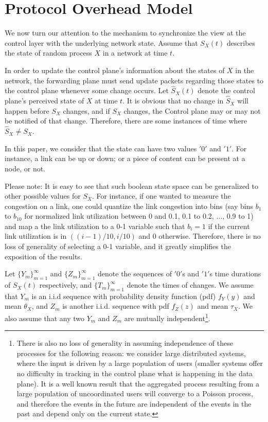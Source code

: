 \documentclass[conference]{IEEEtran}
\theoremstyle{plain}
\theoremstyle{remark}
\begin{document}
\section{Protocol Overhead Model}
\label{sec:protocol}

We now turn our attention to the mechanism to synchronize the view at the control layer with the underlying network state. Assume that $S_X(t)$ describes the state of random process $X$ in a network at time $t$. 

In order to update the control plane's information about the states of $X$ in the network, the forwarding plane must send update packets regarding those states to the control plane whenever some change occurs. Let $\hat{S}_X(t)$ denote the control plane's perceived state of $X$ at time $t$. It is obvious that no change in $\hat{S}_X$ will happen before $S_X$ changes, and if $S_X$ changes, the Control plane may or may not be notified of that change. Therefore,  there are some instances of time where $\hat{S}_X\ne S_X$. 

In this paper, we consider that the state can have two values $'0'$ and $'1'$. For instance, a link can be up or down; or a piece of content can be present at a node, or not. 

Please note: It is easy to see that such boolean state space can be generalized to other possible values for $S_X$. For instance, if one wanted to measure the congestion on a link, one could quantize the link congestion into bins (say bins $b_1$ to $b_{10}$ for normalized link utilization between 0 and 0.1, 0.1 to 0.2, $\ldots$, 0.9 to 1) and map a the link utilization to a 0-1 variable such that $b_i = 1$ if the current link utilization is in $((i-1)/10,i/10)$ and 0 otherwise. Therefore, there is no loss of generality of selecting a 0-1 variable, and it greatly simplifies the exposition of the results. 

Let $\{Y_m\}_{m=1}^{\infty}$ and $\{Z_m\}_{m=1}^{\infty}$ denote the sequences of $'0'$s and $'1'$s time durations of $S_X(t)$ respectively, and $\{T_m\}_{m=1}^{\infty}$ denote the times of changes. We assume that $Y_m$ is an i.i.d sequence with probability density function (pdf) $f_Y(y)$ and mean $\theta_X$, and $Z_m$ is another i.i.d. sequence with pdf $f_Z(z)$ and mean $\tau_X$. We also assume that any two $Y_m$ and $Z_m$ are mutually independent\footnote{There is also no loss of generality in assuming independence of these processes for the following reason: we consider large distributed systems, where the input is driven by a large population of users (smaller systems offer no difficulty in tracking in the control plane what is happening in the data plane). It is a well known result that the aggregated process resulting from a large population of uncoordinated users will converge to a Poisson process, and therefore the events in the future are independent of the events in the past and depend only on the current state.}.
\end{document}
